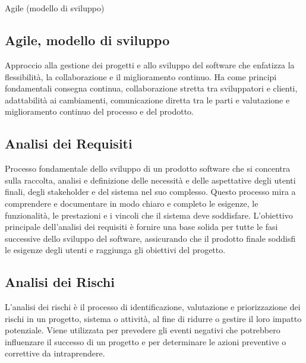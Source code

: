 \appendix %



\section{}

\hypertarget{sec:modello_agile}{Agile (modello di sviluppo)}
\subsection*{Agile, modello di sviluppo}
Approccio alla gestione dei progetti e allo sviluppo del software che enfatizza la flessibilità, la collaborazione e il miglioramento continuo. 
Ha come principi fondamentali consegna continua, collaborazione stretta tra sviluppatori e clienti, adattabilità ai cambiamenti, 
comunicazione diretta tra le parti e valutazione e miglioramento continuo del processo e del prodotto.

\subsection*{Analisi dei Requisiti}
Processo fondamentale dello sviluppo di un prodotto software che si concentra sulla raccolta, analisi e definizione delle necessità e delle aspettative 
degli utenti finali, degli stakeholder e del sistema nel suo complesso. Questo processo mira a comprendere e documentare in modo chiaro e completo le 
esigenze, le funzionalità, le prestazioni e i vincoli che il sistema deve soddisfare. L’obiettivo principale dell’analisi dei requisiti è fornire una 
base solida per tutte le fasi successive dello sviluppo del software, assicurando che il prodotto finale soddisfi le esigenze degli utenti e raggiunga 
gli obiettivi del progetto.

\subsection*{Analisi dei Rischi}
L'analisi dei rischi è il processo di identificazione, valutazione e priorizzazione dei rischi in un progetto, sistema o attività, al fine di ridurre 
o gestire il loro impatto potenziale. Viene utilizzata per prevedere gli eventi negativi che potrebbero influenzare il successo di un progetto e per 
determinare le azioni preventive o correttive da intraprendere.

